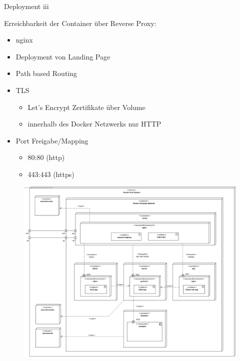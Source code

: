 \begin{frame}{Deployment iii}
    \begin{minipage}[t]{0.35\textwidth}
        Erreichbarkeit der Container über Reverse Proxy:
        \begin{itemize}
            \item nginx
            \item Deployment von Landing Page
            \item Path based Routing
            \item TLS
            \begin{itemize}
                \item Let's Encrypt Zertifikate über Volume
                \item innerhalb des Docker Netzwerks nur HTTP
            \end{itemize}
            \item Port Freigabe/Mapping
            \begin{itemize}
                \item 80:80 (http)
                \item 443:443 (https)
            \end{itemize}
        \end{itemize}
    \end{minipage}
    \hfill
    \begin{minipage}[t]{0.63\textwidth}
        \begin{figure}
            \begin{center}
                \includegraphics[width=\textwidth]{images/deployment/deployment_diagram_full.jpg}
            \end{center}
        \end{figure}
    \end{minipage}
\end{frame}